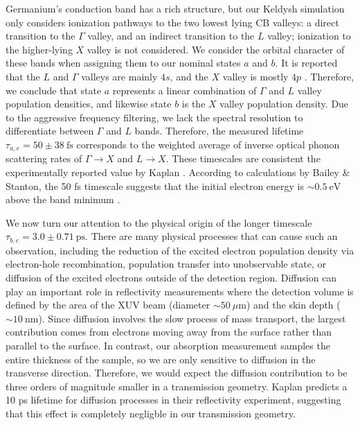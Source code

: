 Germanium's conduction band has a rich structure, but our Keldysh simulation only considers ionization pathways to the two lowest lying CB valleys: a direct transition to the $\Gamma$ valley, and an indirect transition to the $L$ valley; ionization to the higher-lying $X$ valley is not considered. We consider the orbital character of these bands when assigning them to our nominal states $a$ and $b$. It is reported that the $L$ and $\Gamma$ valleys are mainly $4s$, and the $X$ valley is mostly $4p$ \cite{zurchDirectSimultaneousObservation2017,kaplanFemtosecondTrackingCarrier2018}. Therefore, we conclude that state $a$ represents a linear combination of $\Gamma$ and $L$ valley population densities, and likewise state $b$ is the $X$ valley population density. Due to the aggressive frequency filtering, we lack the spectral resolution to differentiate between $\Gamma$ and $L$ bands. Therefore, the measured lifetime $\tau_{a,e} = 50 \pm 38 \ \textrm{fs}$ corresponds to the weighted average of inverse optical phonon scattering rates of $\Gamma \rightarrow X$ and $L \rightarrow X$. These timescales are consistent the experimentally reported value by Kaplan \cite{kaplanFemtosecondTrackingCarrier2018}. According to calculations by Bailey \& Stanton, the 50 fs timescale suggests that the initial electron energy is $\sim 0.5 \ \textrm{eV}$ above the band minimum  \cite{baileyCalculationsFemtosecondDifferential1995}.

We now turn our attention to the physical origin of the longer timescale $\tau_{b,e} = 3.0 \pm 0.71 \ \textrm{ps}$. There are many physical processes that can cause such an observation, including the reduction of the excited electron population density via electron-hole recombination, population transfer into unobservable state, or diffusion of the excited electrons outside of the detection region. Diffusion can play an important role in reflectivity measurements where the detection volume is defined by the area of the XUV beam (diameter $\sim 50 \ \mu\textrm{m}$) and the skin depth ($\sim 10 \ \textrm{nm}$). Since diffusion involves the slow process of mass transport, the largest contribution comes from electrons moving away from the surface rather than parallel to the surface. In contrast, our absorption measurement samples the entire thickness of the sample, so we are only sensitive to diffusion in the transverse direction. Therefore, we would expect the diffusion contribution to be three orders of magnitude smaller in a transmission geometry. Kaplan predicts a 10 ps lifetime for diffusion processes in their reflectivity experiment, suggesting that this effect is completely negligble in our transmission geometry.

